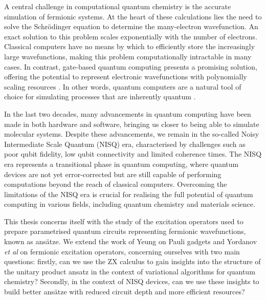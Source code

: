 A central challenge in computational quantum chemistry is the accurate simulation of fermionic systems. At the heart of these calculations lies the need to solve the Schrödinger equation to determine the many-electron wavefunction. An exact solution to this problem scales exponentially with the number of electrons. Classical computers have no means by which to efficiently store the increasingly large wavefunctions, making this problem computationally intractable in many cases. In contrast, gate-based quantum computing presents a promising solution, offering the potential to represent electronic wavefunctions with polynomially scaling resources \cite{Burton2023}. In other words, quantum computers are a natural tool of choice for simulating processes that are inherently quantum \cite{Yeung2020}.

In the last two decades, many advancements in quantum computing have been made in both hardware and software, bringing us closer to being able to simulate molecular systems. Despite these advancements, we remain in the so-called Noisy Intermediate Scale Quantum (NISQ) era, characterised by challenges such as poor qubit fidelity, low qubit connectivity and limited coherence times. The NISQ era represents a transitional phase in quantum computing, where quantum devices are not yet error-corrected but are still capable of performing computations beyond the reach of classical computers. Overcoming the limitations of the NISQ era is crucial for realising the full potential of quantum computing in various fields, including quantum chemistry and materials science.


This thesis concerns itself with the study of the excitation operators used to prepare parametrised quantum circuits representing fermionic wavefunctions, known as ansätze. We extend the work of Yeung \cite{Yeung2020} on Pauli gadgets and Yordanov \textit{et al} \cite{Yordanov2020} on fermionic excitation operators, concerning ourselves with two main questions: firstly, can we use the ZX calculus to gain insights into the structure of the unitary product ansatz in the context of variational algorithms for quantum chemistry? Secondly, in the context of NISQ devices, can we use these insights to build better ansätze with reduced circuit depth and more efficient resources?

